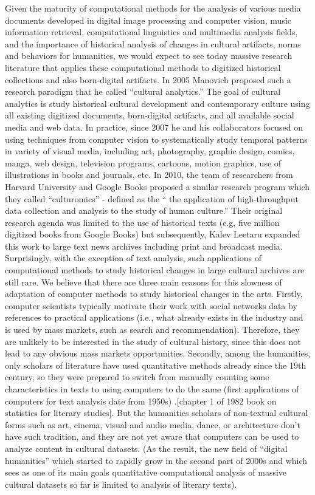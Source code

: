\documentclass[letterpaper]{article}
\begin{document}
Given the maturity of computational methods for the analysis of various media documents developed in digital image processing and computer vision, music information retrieval, computational linguistics and multimedia analysis fields, and the importance of historical analysis of changes in cultural artifacts, norms and behaviors for humanities, we would expect to see today massive research literature that applies these computational methods to digitized historical collections and also born-digital artifacts. In 2005 Manovich proposed such a research paradigm that he called “cultural analytics.” The goal of cultural analytics is study historical cultural development and contemporary culture using all existing digitized documents, born-digital artifacts, and all available social media and web data. In practice, since 2007 he and his collaborators focused on using techniques from computer vision to systematically study temporal patterns in variety of visual media, including art, photography, graphic design, comics, manga, web design, television programs, cartoons, motion graphics, use of illustrations in books and journals, etc. In 2010, the team of researchers from Harvard University and Google Books proposed a similar research program which they called “culturomics” - defined as the “ the application of high-throughput data collection and analysis to the study of human culture.” Their original research agenda was limited to the use of historical texts (e.g, five million digitized books from Google Books) but subsequently, Kalev Leetaru expanded this work to large text news archives including print and broadcast media. 
Surprisingly, with the exception of text analysis, such applications of computational methods to study historical changes in large cultural archives are still rare. We believe that there are three main reasons for this slowness of adaptation of computer methods to study historical changes in the arts. Firstly, computer scientists typically motivate their work with social networks data by references to practical applications (i.e., what already exists in the industry and is used by mass markets, such as search and recommendation). Therefore, they are unlikely to be interested in the study of cultural history, since this does not lead to any obvious mass markets opportunities. Secondly, among the humanities, only scholars of literature have used quantitative methods already since the 19th century, so they were prepared to switch from manually counting some characteristics in texts to using computers to do the same (first applications of computers for text analysis date from 1950s) .[chapter 1 of 1982 book on statistics for literary studies]. But the humanities scholars of non-textual cultural forms such as art, cinema, visual and audio media, dance, or architecture don’t have such tradition, and they are not yet aware that computers can be used to analyze content in cultural datasets. (As the result, the new field of “digital humanities” which started to rapidly grow in the second part of 2000s and which sees as one of its main goals quantitative computational analysis of massive cultural datasets so far is limited to analysis of literary texts). 
\end{document}
